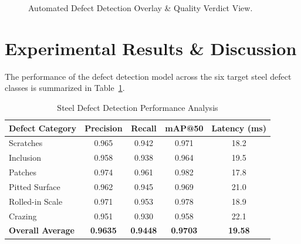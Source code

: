 \documentclass[conference]{IEEEtran}
\begin{document}
\begin{figure}[htbp]
\centering
\caption{Automated Defect Detection Overlay & Quality Verdict View.}
\label{fig:screenshot_detection}
\end{figure}

\section{Experimental Results & Discussion}

The performance of the defect detection model across the six target steel defect classes is summarized in Table~\ref{tab:performance}.

\begin{table}[htbp]
\caption{Steel Defect Detection Performance Analysis}
\begin{center}
\begin{tabular}{lcccc}
\toprule
\textbf{Defect Category} & \textbf{Precision} & \textbf{Recall} & \textbf{mAP@50} & \textbf{Latency (ms)} \\
\midrule
Scratches & 0.965 & 0.942 & 0.971 & 18.2 \\
Inclusion & 0.958 & 0.938 & 0.964 & 19.5 \\
Patches & 0.974 & 0.961 & 0.982 & 17.8 \\
Pitted Surface & 0.962 & 0.945 & 0.969 & 21.0 \\
Rolled-in Scale & 0.971 & 0.953 & 0.978 & 18.9 \\
Crazing & 0.951 & 0.930 & 0.958 & 22.1 \\
\midrule
\textbf{Overall Average} & \textbf{0.9635} & \textbf{0.9448} & \textbf{0.9703} & \textbf{19.58} \\
\bottomrule
\end{tabular}
\label{tab:performance}
\end{center}
\end{table}
\end{document}
